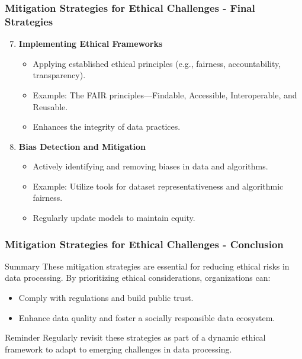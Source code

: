 \documentclass{beamer}
\begin{document}
\begin{frame}[fragile]
    \frametitle{Mitigation Strategies for Ethical Challenges - Final Strategies}
    \begin{enumerate}
        \setcounter{enumi}{6}
        \item \textbf{Implementing Ethical Frameworks}
        \begin{itemize}
            \item Applying established ethical principles (e.g., fairness, accountability, transparency).
            \item Example: The FAIR principles—Findable, Accessible, Interoperable, and Reusable.
            \item Enhances the integrity of data practices.
        \end{itemize}

        \item \textbf{Bias Detection and Mitigation}
        \begin{itemize}
            \item Actively identifying and removing biases in data and algorithms.
            \item Example: Utilize tools for dataset representativeness and algorithmic fairness.
            \item Regularly update models to maintain equity.
        \end{itemize}
    \end{enumerate}
\end{frame}

\begin{frame}[fragile]
    \frametitle{Mitigation Strategies for Ethical Challenges - Conclusion}
    \begin{block}{Summary}
        These mitigation strategies are essential for reducing ethical risks in data processing. By prioritizing ethical considerations, organizations can:
    \end{block}
    \begin{itemize}
        \item Comply with regulations and build public trust.
        \item Enhance data quality and foster a socially responsible data ecosystem.
    \end{itemize}
    \begin{block}{Reminder}
        Regularly revisit these strategies as part of a dynamic ethical framework to adapt to emerging challenges in data processing.
    \end{block}
\end{frame}
\end{document}
